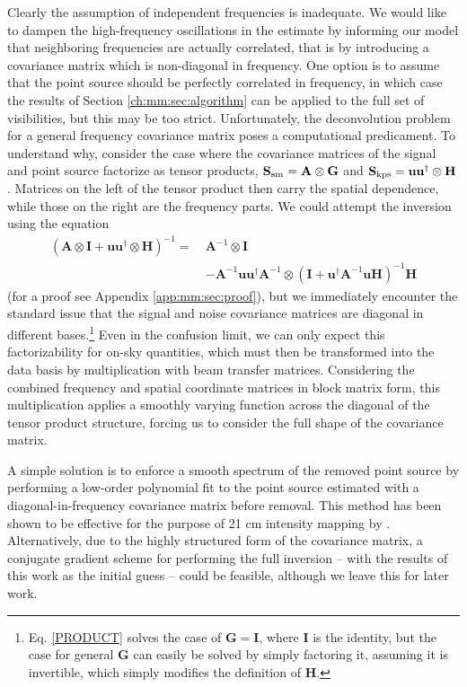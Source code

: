 Clearly the assumption of independent frequencies is inadequate. We would like to dampen the high-frequency oscillations in the estimate by informing our model that neighboring frequencies are actually correlated, that is by introducing a covariance matrix which is non-diagonal in frequency. One option is to assume that the point source should be perfectly correlated in frequency, in which case the results of Section \ref{ch:mm:sec:algorithm} can be applied to the full set of visibilities, but this may be too strict. Unfortunately, the deconvolution problem for a general frequency covariance matrix poses a computational predicament. To understand why, consider the case where the covariance matrices of the signal and point source factorize as tensor products, $\mathbf{S}_{\rm sm} = \mathbf{A} \otimes\mathbf{G}$ and $\mathbf{S}_{\rm kps} = \mathbf{u}\mathbf{u}^\dagger \otimes\mathbf{H}$. Matrices on the left of the tensor product then carry the spatial dependence, while those on the right are the frequency parts. We could attempt the inversion using the equation
\begin{align}
\left(\mathbf{A} \otimes \mathbf{I} + \mathbf{u}\mathbf{u}^\dagger \otimes \mathbf{H} \right)^{-1} = ~& \mathbf{A}^{-1} \otimes \mathbf{I} \label{PRODUCT}
\\ &- \mathbf{A}^{-1}\mathbf{u}\mathbf{u}^\dagger\mathbf{A}^{-1} \otimes \left(\mathbf{I} + \mathbf{u}^\dagger\mathbf{A}^{-1}\mathbf{u} \mathbf{H}\right)^{-1} \mathbf{H} \nonumber
\end{align}
(for a proof see Appendix \ref{app:mm:sec:proof}), but we immediately encounter the standard issue that the signal and noise covariance matrices are diagonal in different bases.\footnote{Eq. \eqref{PRODUCT} solves the case of $\mathbf{G}=\mathbf{I}$, where $\mathbf{I}$ is the identity, but the case for general $\mathbf{G}$ can easily be solved by simply factoring it, assuming it is invertible, which simply modifies the definition of $\mathbf{H}$.} Even in the confusion limit, we can only expect this factorizability for on-sky quantities, which must then be transformed into the data basis by multiplication with beam transfer matrices. Considering the combined frequency and spatial coordinate matrices in block matrix form, this multiplication applies a smoothly varying function across the diagonal of the tensor product structure, forcing us to consider the full shape of the covariance matrix.

A simple solution is to enforce a smooth spectrum of the removed point source by performing a low-order polynomial fit to the point source estimated with a diagonal-in-frequency covariance matrix before removal. This method has been shown to be effective for the purpose of 21 cm intensity mapping by \cite{barry2016}. Alternatively, due to the highly structured form of the covariance matrix, a conjugate gradient scheme for performing the full inversion -- with the results of this work as the initial guess -- could be feasible, although we leave this for later work.

